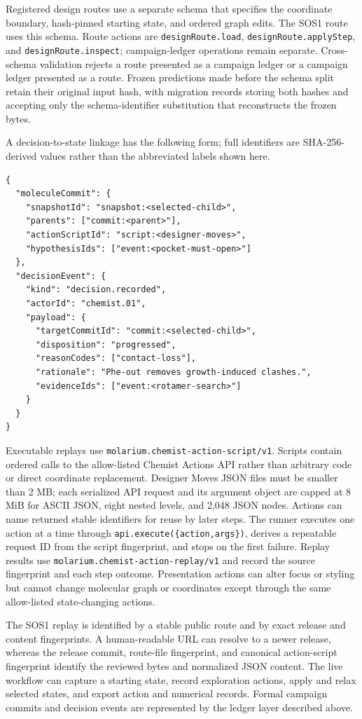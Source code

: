 \documentclass[11pt]{article}
\begin{document}
\begin{small}
Registered design routes use a separate  schema that specifies the coordinate boundary, hash-pinned starting state, and ordered graph edits. The SOS1 route uses this schema. Route actions are \texttt{designRoute.load}, \texttt{designRoute.applyStep}, and \texttt{designRoute.inspect}; campaign-ledger operations remain separate. Cross-schema validation rejects a route presented as a campaign ledger or a campaign ledger presented as a route. Frozen predictions made before the schema split retain their original input hash, with migration records storing both hashes and accepting only the schema-identifier substitution that reconstructs the frozen bytes.

A decision-to-state linkage has the following form; full identifiers are SHA-256-derived values rather than the abbreviated labels shown here.

\begin{lstlisting}
{
  "moleculeCommit": {
    "snapshotId": "snapshot:<selected-child>",
    "parents": ["commit:<parent>"],
    "actionScriptId": "script:<designer-moves>",
    "hypothesisIds": ["event:<pocket-must-open>"]
  },
  "decisionEvent": {
    "kind": "decision.recorded",
    "actorId": "chemist.01",
    "payload": {
      "targetCommitId": "commit:<selected-child>",
      "disposition": "progressed",
      "reasonCodes": ["contact-loss"],
      "rationale": "Phe-out removes growth-induced clashes.",
      "evidenceIds": ["event:<rotamer-search>"]
    }
  }
}
\end{lstlisting}

Executable replays use \texttt{molarium.chemist-action-script/v1}. Scripts contain ordered calls to the allow-listed Chemist Actions API rather than arbitrary code or direct coordinate replacement. Designer Moves JSON files must be smaller than 2 MB; each serialized API request and its argument object are capped at 8 MiB for ASCII JSON, eight nested levels, and 2,048 JSON nodes. Actions can name returned stable identifiers for reuse by later steps. The runner executes one action at a time through \texttt{api.execute(\{action,args\})}, derives a repeatable request ID from the script fingerprint, and stops on the first failure. Replay results use \texttt{molarium.chemist-action-replay/v1} and record the source fingerprint and each step outcome. Presentation actions can alter focus or styling but cannot change molecular graph or coordinates except through the same allow-listed state-changing actions.

The SOS1 replay is identified by a stable public route and by exact release and content fingerprints. A human-readable URL can resolve to a newer release, whereas the release commit, route-file fingerprint, and canonical action-script fingerprint identify the reviewed bytes and normalized JSON content. The live workflow can capture a starting state, record exploration actions, apply and relax selected states, and export action and numerical records. Formal campaign commits and decision events are represented by the ledger layer described above.


\end{small}
\end{document}
